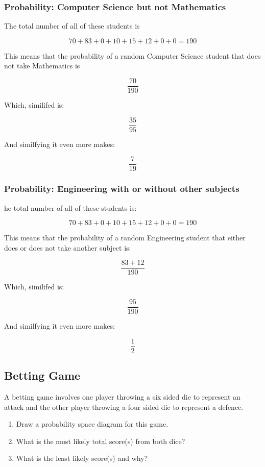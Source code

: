 \documentclass[a4paper,12pt]{article}
\begin{document}
\subsubsection{Probability: Computer Science but not Mathematics}

The total number of all of these students is

$$70 + 83 + 0 + 10 + 15 + 12 + 0 + 0 = 190$$

This means that the probability of a random Computer Science student that does not take Mathematics is

$$\frac{70}{190}$$

Which, similifed is:

$$\frac{35}{95}$$

And similfying it even more makes:

$$\frac{7}{19}$$

\subsubsection{Probability: Engineering with or without other subjects}

he total number of all of these students is:

$$70 + 83 + 0 + 10 + 15 + 12 + 0 + 0 = 190$$

This means that the probability of a random Engineering student that either does or does not take another subject is:

$$\frac{83 + 12}{190}$$

Which, similifed is:

$$\frac{95}{190}$$

And similfying it even more makes:

$$\frac{1}{2}$$

\newpage

\subsection{Betting Game}
A betting game involves one player throwing a six sided die to represent an attack and the other player throwing a four sided die to represent a defence.
\begin{enumerate}
  \item Draw a probability space diagram for this game.
  \item What is the most likely total score(s) from both dice?
  \item What is the least likely score(s) and why?
\end{enumerate}

\begin{tabular}{c}
\end{tabular}
\end{document}
